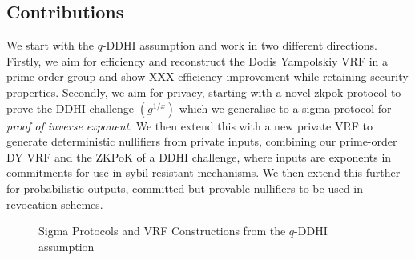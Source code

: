 \subsection{Contributions}\label{sec:vrf-contributions}
We start with the $q$-DDHI assumption and work in two different directions. Firstly, we aim for efficiency and reconstruct the Dodis Yampolskiy VRF in a prime-order group and show XXX efficiency improvement while retaining security properties. Secondly, we aim for privacy,  starting with a novel zkpok protocol to prove the DDHI challenge $(g^{1/x})$ which we generalise to a sigma protocol for \emph{proof of inverse exponent}. We then extend this with a new private VRF to generate deterministic nullifiers from private inputs, combining our prime-order DY VRF and the ZKPoK of a DDHI challenge, where inputs are exponents in commitments for use in sybil-resistant mechanisms. We then extend this further for probabilistic outputs, committed but provable nullifiers to be used in revocation schemes. 


\begin{figure}[ht]
\centering
{}
\caption{Sigma Protocols and VRF Constructions from the $q$-DDHI assumption}
\label{fig:vrf-construction-overview}
\end{figure}

